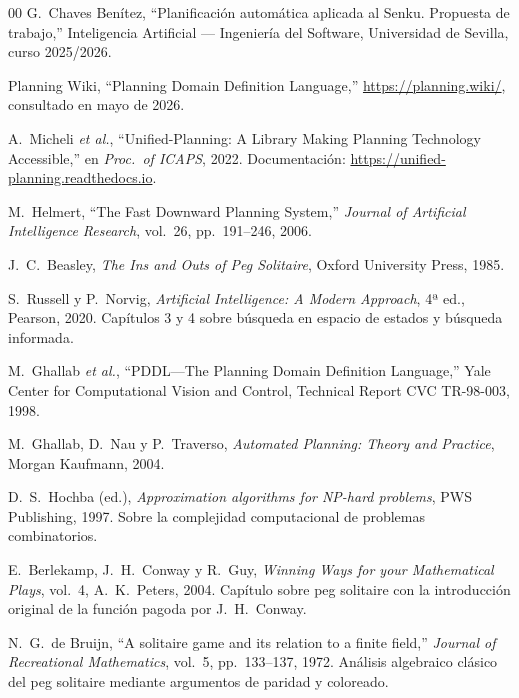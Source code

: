 \documentclass[conference,a4paper]{IEEEtran}
\begin{document}
\begin{thebibliography}{00}
 G.~Chaves Benítez, ``Planificación automática aplicada
al Senku. Propuesta de trabajo,'' Inteligencia Artificial --- Ingeniería
del Software, Universidad de Sevilla, curso 2025/2026.

 Planning Wiki, ``Planning Domain Definition Language,''
\url{https://planning.wiki/}, consultado en mayo de 2026.

 A.~Micheli \emph{et al.}, ``Unified-Planning: A Library
Making Planning Technology Accessible,'' en \emph{Proc.\ of ICAPS}, 2022.
Documentación: \url{https://unified-planning.readthedocs.io}.

 M.~Helmert, ``The Fast Downward Planning System,''
\emph{Journal of Artificial Intelligence Research}, vol.~26,
pp.~191--246, 2006.

 J.~C.~Beasley, \emph{The Ins and Outs of Peg
Solitaire}, Oxford University Press, 1985.

 S.~Russell y P.~Norvig, \emph{Artificial
Intelligence: A Modern Approach}, 4ª ed., Pearson, 2020. Capítulos 3 y 4
sobre búsqueda en espacio de estados y búsqueda informada.

 M.~Ghallab \emph{et al.}, ``PDDL---The Planning
Domain Definition Language,'' Yale Center for Computational Vision and
Control, Technical Report CVC TR-98-003, 1998.

 M.~Ghallab, D.~Nau y P.~Traverso,
\emph{Automated Planning: Theory and Practice}, Morgan Kaufmann, 2004.

 D.~S.~Hochba (ed.), \emph{Approximation algorithms for
NP-hard problems}, PWS Publishing, 1997. Sobre la complejidad
computacional de problemas combinatorios.

 E.~Berlekamp, J.~H.~Conway y R.~Guy, \emph{Winning
Ways for your Mathematical Plays}, vol.~4, A.~K.~Peters, 2004. Capítulo
sobre peg solitaire con la introducción original de la función pagoda
por J.~H.~Conway.

 N.~G.~de Bruijn, ``A solitaire game and its
relation to a finite field,'' \emph{Journal of Recreational
Mathematics}, vol.~5, pp.~133--137, 1972. Análisis algebraico clásico
del peg solitaire mediante argumentos de paridad y coloreado.
\end{thebibliography}
\end{document}
